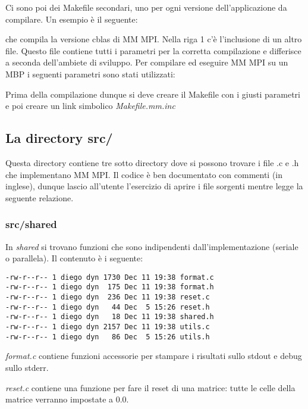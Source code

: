 

Ci sono poi dei Makefile secondari, uno per ogni versione dell'applicazione da compilare. Un esempio \`{e} il seguente:



che compila la versione cblas di MM MPI. Nella riga 1 c'\`{e} l'inclusione di un altro file. Questo file contiene tutti i parametri per la corretta compilazione e differisce a seconda dell'ambiete di sviluppo. Per compilare ed eseguire MM MPI su un MBP i seguenti parametri sono stati utilizzati:



Prima della compilazione dunque si deve creare il Makefile con i giusti parametri e poi creare un link simbolico \textit{Makefile.mm.inc}

\subsection{La directory src/}
Questa directory contiene tre sotto directory dove si possono trovare i file .c e .h che implementano MM MPI. Il codice \`{e} ben documentato con commenti (in inglese), dunque lascio all'utente l'esercizio di aprire i file sorgenti mentre legge la seguente relazione.

\subsubsection{src/shared}
In \textit{shared} si trovano funzioni che sono indipendenti dall'implementazione (seriale o parallela). Il contenuto \`{e} i seguente:

\begin{lstlisting}
-rw-r--r-- 1 diego dyn 1730 Dec 11 19:38 format.c
-rw-r--r-- 1 diego dyn  175 Dec 11 19:38 format.h
-rw-r--r-- 1 diego dyn  236 Dec 11 19:38 reset.c
-rw-r--r-- 1 diego dyn   44 Dec  5 15:26 reset.h
-rw-r--r-- 1 diego dyn   18 Dec 11 19:38 shared.h
-rw-r--r-- 1 diego dyn 2157 Dec 11 19:38 utils.c
-rw-r--r-- 1 diego dyn   86 Dec  5 15:26 utils.h
\end{lstlisting}

\textit{format.c} contiene funzioni accessorie per stampare i risultati sullo stdout e debug sullo stderr.

\textit{reset.c} contiene una funzione per fare il reset di una matrice: tutte le celle della matrice verranno impostate a 0.0.

